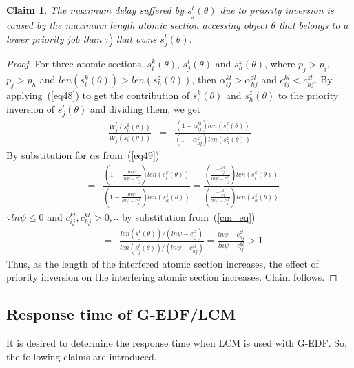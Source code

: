\documentclass[conference]{IEEEtran}
\newtheorem{clm}{Claim}
\begin{document}
\begin{clm}
\label{max_pri_inv}
The maximum delay suffered by $s_j^l(\theta)$ due to priority inversion is caused by the maximum length atomic section accessing object $\theta$ that belongs to a lower priority job than $\tau_j^b$ that owns $s_j^l(\theta)$.
\end{clm}

\begin{proof}
For three atomic sections, $s_i^k(\theta)$, $s_j^l(\theta)$ and $s_h^z(\theta)$, where $p_j>p_i$, $p_j>p_h$ and $len(s_i^k(\theta))>len(s_h^z(\theta))$, then $\alpha_{ij}^{kl}>\alpha_{hj}^{zl}$ and $c_{ij}^{kl}<c_{hj}^{zl}$. By applying~(\ref{eq48}) to get the contribution of $s_i^k(\theta)$ and $s_h^z(\theta)$ to the priority inversion of $s_j^l(\theta)$ and dividing them, we get
\begin{eqnarray*}
\frac{W_{j}^{l}(s_{i}^{k}(\theta))}{W_{j}^{l}(s_{h}^{z}(\theta))} & = & \frac{\left(1-\alpha_{ij}^{kl}\right)len(s_{i}^{k}(\theta))}{\left(1-\alpha_{hj}^{zl}\right)len(s_{h}^{z}(\theta))}
\end{eqnarray*}
By substitution for $\alpha$s from~(\ref{eq49})
\begin{eqnarray*}
 & = & \frac{(1-\frac{ln\psi}{ln\psi-c_{ij}^{kl}})len(s_{i}^{k}(\theta))}{(1-\frac{ln\psi}{ln\psi-c_{hj}^{zl}})len(s_{h}^{z}(\theta))}
  =  \frac{(\frac{-c_{ij}^{kl}}{ln\psi-c_{ij}^{kl}})len(s_{i}^{k}(\theta))}{(\frac{-c_{hj}^{zl}}{ln\psi-c_{hj}^{zl}})len(s_{h}^{z}(\theta))}\end{eqnarray*}
$\because ln\psi \le 0$ and $c_{ij}^{kl},c_{hj}^{kl} > 0, \therefore$ by substitution from~(\ref{cm_eq})
\begin{eqnarray*}
 & = & \frac{len(s_{j}^{l}(\theta))/(ln\psi-c_{ij}^{kl})}{len(s_{j}^{l}(\theta))/(ln\psi-c_{hj}^{zl})}
  =  \frac{ln\psi-c_{hj}^{zl}}{ln\psi-c_{ij}^{kl}}>1\end{eqnarray*}
Thus, as the length of the interfered atomic section increases, the effect of priority inversion on the interfering atomic section increases. Claim follows.

\end{proof}

\subsection{\label{response g-edf/lcm} Response time of G-EDF/LCM}

It is desired to determine the response time when LCM is used with G-EDF. So, the following claims are introduced.
\end{document}
